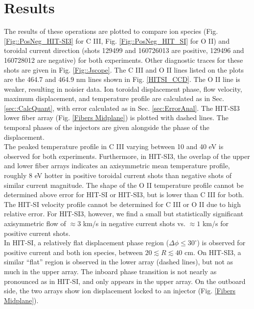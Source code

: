 \section{Results}
\hspace{4ex}The results of these operations are plotted to compare ion species (Fig.\ref{Fig::PosNeg_HIT-SI3} for C III,  Fig. \ref{Fig::PosNeg_HIT_SI} for O II) and toroidal current direction (shots 129499 and 160726013 are positive, 129496 and 160728012 are negative) for both experiments. Other diagnostic traces for these shots are given in Fig. \ref{Fig::Jscope}. The C III and O II lines listed on the plots are the 464.7 and 464.9 nm lines shown in Fig. \ref{HITSI_CCD}. The O II line is weaker, resulting in noisier data. Ion toroidal displacement phase, flow velocity, maximum displacement, and temperature profile are calculated as in Sec. \ref{sec::CalcQuant}, with error calculated as in Sec. \ref{sec:ErrorAnal}. The HIT-SI3 lower fiber array (Fig. \ref{Fibers Midplane}) is plotted with dashed lines. The temporal phases of the injectors are given alongside the phase of the displacement.\\
\hspace*{4ex}The peaked temperature profile in C III varying between 10 and 40 eV  is observed for both experiments. Furthermore, in HIT-SI3, the overlap of the upper and lower fiber arrays indicates an axisymmetric mean temperature profile, roughly 8 eV hotter in positive toroidal current shots than negative shots of similar current magnitude. The shape of the O II temperature profile cannot be determined above error for HIT-SI or HIT-SI3, but is lower than C III for both.\\
\hspace*{4ex}The HIT-SI velocity profile cannot be determined for C III or O II due to high relative error. For HIT-SI3, however, we find a small but statistically significant axisymmetric flow of $\approx3$ km/s in negative current shots vs. $\approx1$ km/s for  positive current shots.\\
\hspace*{4ex}In HIT-SI, a relatively flat displacement phase region ($\Delta\phi\leq30^\circ$) is observed for positive current and both ion species, between $20\lesssim{R}\lesssim40$ cm. On HIT-SI3, a similar ``flat'' region is observed in the lower array (dashed lines), but not as much in the upper array. The inboard phase transition is not nearly as pronounced as in HIT-SI, and only appears in the upper array. On the outboard side, the two arrays show ion displacement locked to an injector (Fig. \ref{Fibers Midplane}).

